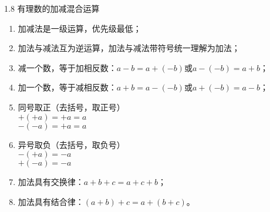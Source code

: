 \documentclass[aspectratio=169]{ctexbeamer} %
\date{\today}
\begin{document}
\begin{frame}[t]{1.8 有理数的加减混合运算}
\begin{spacing}{1.2}
\normalsize
\begin{enumerate}[label={\arabic*.}]
\item 加减法是一级运算，优先级最低；
\item 加法与减法互为逆运算，加法与减法带符号统一理解为加法；
\item 减一个数，等于加相反数：$a - b = a + (-b)$或$a - (-b) = a + b$；
\item 加一个数，等于减相反数：$a + b = a -(-b)$或$a + (-b) = a - b$；
\item 同号取正（去括号，取正号） \\
$+(+a) = +a = a$ \\
$-(-a) = +a = a$ \\
\item 异号取负（去括号，取负号）\\
$-(+a) = -a$ \\
$+(-a) = -a$ \\
\item 加法具有交换律：$a + b + c = a + c + b$；
\item 加法具有结合律：$(a + b) + c = a + (b + c)$。
\end{enumerate}

\end{spacing}
\end{frame}
\end{document}

